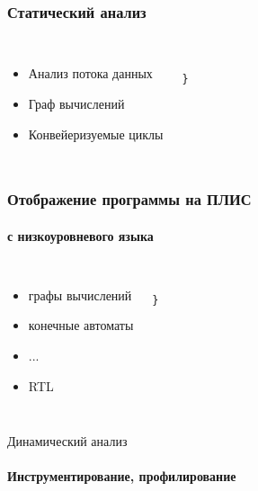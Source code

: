 \documentclass{beamer}              %
\begin{document}
\begin{frame}[fragile]
\frametitle{Статический анализ}
  \framesubtitle{}
  \begin{columns}
        \begin{itemize}
            \item Анализ потока данных
            \item Граф вычислений
            \item Конвейеризуемые циклы
        \end{itemize}      


 
      
\begin{lstlisting}[frame=single]

}
\end{lstlisting}
\label{encode_listing}
      
  \end{columns}
  
\end{frame}

\begin{frame}[fragile]
\frametitle{Отображение программы на ПЛИС}
  \framesubtitle{с низкоуровневого языка}
  \begin{columns}
        \begin{itemize}
            \item графы вычислений
            \item конечные автоматы
            \item ...
            \item RTL
        \end{itemize}      



\begin{lstlisting}[frame=single]

}
\end{lstlisting}
\label{encode_listing}
      
  \end{columns}
  
\end{frame}

\setwatermark{}

\begin{frame}{Динамический анализ}
  \framesubtitle{Инструментирование, профилирование}
\end{frame}
\end{document}
